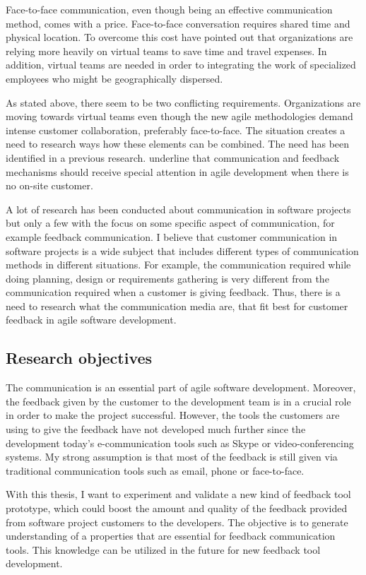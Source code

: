 \documentclass[english,12pt,a4paper,pdftex]{article}
\begin{document}
Face-to-face communication, even though being an effective communication method, comes with a price. Face-to-face conversation requires shared time and physical location. To overcome this cost \citet{derosa2004} have pointed out that organizations are relying more heavily on virtual teams to save time and travel expenses. In addition, virtual teams are needed in order to integrating the work of specialized employees who might be geographically dispersed. 

As stated above, there seem to be two conflicting requirements. Organizations are moving towards virtual teams even though the new agile methodologies demand intense customer collaboration, preferably face-to-face. The situation creates a need to research ways how these elements can be combined. The need has been identified in a previous research. \citet{korkala2006} underline that communication and feedback mechanisms should receive special attention in agile development when there is no on-site customer.

A lot of research has been conducted about communication in software projects but only a few with the focus on some specific aspect of communication, for example feedback communication. I believe that customer communication in software projects is a wide subject that includes different types of communication methods in different situations. For example, the communication required while doing planning, design or requirements gathering is very different from the communication required when a customer is giving feedback. Thus, there is a need to research what the communication media are, that fit best for customer feedback in agile software development.

\subsection{Research objectives}

The communication is an essential part of agile software development. Moreover, the feedback given by the customer to the development team is in a crucial role in order to make the project successful. However, the tools the customers are using to give the feedback have not developed much further since the development today's e-communication tools such as Skype or video-conferencing systems. My strong assumption is that most of the feedback is still given via traditional communication tools such as email, phone or face-to-face.

With this thesis, I want to experiment and validate a new kind of feedback tool prototype, which could boost the amount and quality of the feedback provided from software project customers to the developers. The objective is to generate understanding of a properties that are essential for feedback communication tools. This knowledge can be utilized in the future for new feedback tool development.
\end{document}
